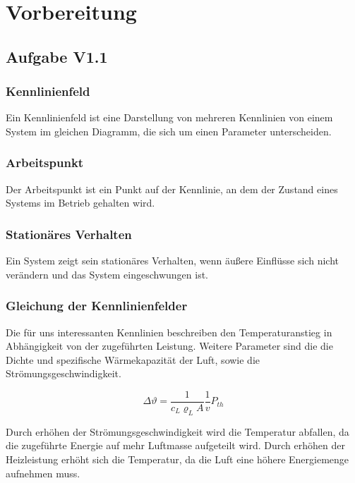 \section{Vorbereitung}

\subsection{Aufgabe V1.1}


\subsubsection{Kennlinienfeld}

Ein Kennlinienfeld ist eine Darstellung von mehreren Kennlinien von einem System im gleichen Diagramm, die sich um einen Parameter unterscheiden.

\subsubsection{Arbeitspunkt}

Der Arbeitspunkt ist ein Punkt auf der Kennlinie, an dem der Zustand eines Systems im Betrieb gehalten wird.

\subsubsection{Stationäres Verhalten}

Ein System zeigt sein stationäres Verhalten, wenn äußere Einflüsse sich nicht verändern und das System eingeschwungen ist.

\subsubsection{Gleichung der Kennlinienfelder}

Die für uns interessanten Kennlinien beschreiben den Temperaturanstieg in Abhängigkeit von der zugeführten Leistung. Weitere Parameter sind die die Dichte und spezifische Wärmekapazität der Luft, sowie die Strömungsgeschwindigkeit. 

\[ \Delta\vartheta  = \frac{1}{c_L \varrho_L A}\frac{1}{v}P_{th} \]

Durch erhöhen der Strömungsgeschwindigkeit wird die Temperatur abfallen, da die zugeführte Energie auf mehr Luftmasse aufgeteilt wird. Durch erhöhen der Heizleistung erhöht sich die Temperatur, da die Luft eine höhere Energiemenge aufnehmen muss.

